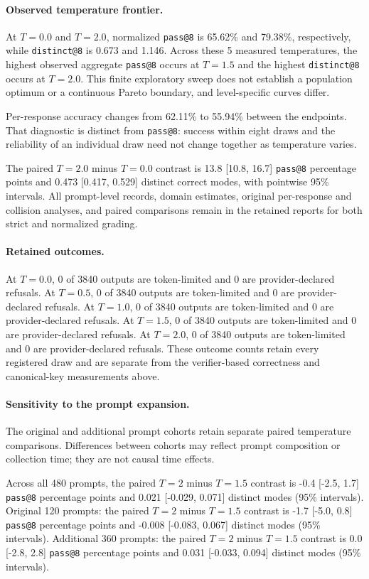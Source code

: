 \paragraph{Observed temperature frontier.}
At $T=0.0$ and $T=2.0$, normalized \texttt{pass@8} is 65.62\% and 79.38\%, respectively,
while \texttt{distinct@8} is 0.673 and 1.146.
Across these 5 measured temperatures, the highest observed aggregate
\texttt{pass@8} occurs at $T=1.5$ and the highest \texttt{distinct@8}
occurs at $T=2.0$. This finite exploratory sweep does not establish
a population optimum or a continuous Pareto boundary, and level-specific curves differ.

Per-response accuracy changes from 62.11\% to 55.94\% between the endpoints.
That diagnostic is distinct from \texttt{pass@8}: success within eight
draws and the reliability of an individual draw need not change together as temperature varies.

The paired $T=2.0$ minus $T=0.0$ contrast is 13.8 [10.8, 16.7] \texttt{pass@8} percentage points and 0.473 [0.417, 0.529] distinct correct modes, with pointwise 95\% intervals.
All prompt-level records, domain estimates, original per-response and
collision analyses, and paired comparisons remain in the retained reports for both strict and normalized grading.

\paragraph{Retained outcomes.}
At $T=0.0$, 0 of 3840 outputs are token-limited and 0 are provider-declared refusals.
At $T=0.5$, 0 of 3840 outputs are token-limited and 0 are provider-declared refusals.
At $T=1.0$, 0 of 3840 outputs are token-limited and 0 are provider-declared refusals.
At $T=1.5$, 0 of 3840 outputs are token-limited and 0 are provider-declared refusals.
At $T=2.0$, 0 of 3840 outputs are token-limited and 0 are provider-declared refusals.
These outcome counts retain every registered draw and are separate from
the verifier-based correctness and canonical-key measurements above.

\paragraph{Sensitivity to the prompt expansion.}
The original and additional prompt cohorts retain separate paired
temperature comparisons. Differences between cohorts may reflect
prompt composition or collection time; they are not causal time effects.

Across all 480 prompts, the paired $T=2$ minus $T=1.5$ contrast is -0.4 [-2.5, 1.7] \texttt{pass@8} percentage points and 0.021 [-0.029, 0.071] distinct modes (95\% intervals).
Original 120 prompts: the paired $T=2$ minus $T=1.5$ contrast is -1.7 [-5.0, 0.8] \texttt{pass@8} percentage points and -0.008 [-0.083, 0.067] distinct modes (95\% intervals).
Additional 360 prompts: the paired $T=2$ minus $T=1.5$ contrast is 0.0 [-2.8, 2.8] \texttt{pass@8} percentage points and 0.031 [-0.033, 0.094] distinct modes (95\% intervals).
